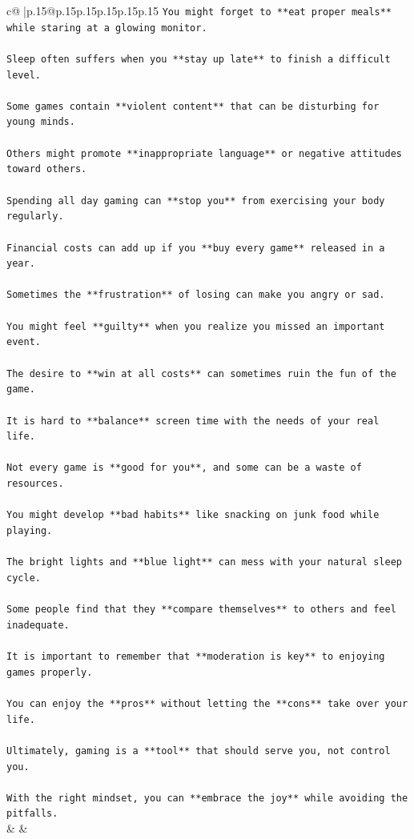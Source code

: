\documentclass{article}
\begin{document}
{\begin{supertabular}{c@{$\;$}|p{.15\linewidth}@{}p{.15\linewidth}p{.15\linewidth}p{.15\linewidth}p{.15\linewidth}p{.15\linewidth}}
{{{\texttt{You might forget to **eat proper meals** while staring at a glowing monitor.} \\
\\ 
\texttt{Sleep often suffers when you **stay up late** to finish a difficult level.} \\
\\ 
\texttt{Some games contain **violent content** that can be disturbing for young minds.} \\
\\ 
\texttt{Others might promote **inappropriate language** or negative attitudes toward others.} \\
\\ 
\texttt{Spending all day gaming can **stop you** from exercising your body regularly.} \\
\\ 
\texttt{Financial costs can add up if you **buy every game** released in a year.} \\
\\ 
\texttt{Sometimes the **frustration** of losing can make you angry or sad.} \\
\\ 
\texttt{You might feel **guilty** when you realize you missed an important event.} \\
\\ 
\texttt{The desire to **win at all costs** can sometimes ruin the fun of the game.} \\
\\ 
\texttt{It is hard to **balance** screen time with the needs of your real life.} \\
\\ 
\texttt{Not every game is **good for you**, and some can be a waste of resources.} \\
\\ 
\texttt{You might develop **bad habits** like snacking on junk food while playing.} \\
\\ 
\texttt{The bright lights and **blue light** can mess with your natural sleep cycle.} \\
\\ 
\texttt{Some people find that they **compare themselves** to others and feel inadequate.} \\
\\ 
\texttt{It is important to remember that **moderation is key** to enjoying games properly.} \\
\\ 
\texttt{You can enjoy the **pros** without letting the **cons** take over your life.} \\
\\ 
\texttt{Ultimately, gaming is a **tool** that should serve you, not control you.} \\
\\ 
\texttt{With the right mindset, you can **embrace the joy** while avoiding the pitfalls.} \\
            }
        }
    }
    & & \\ \\


\end{supertabular}}
\end{document}
